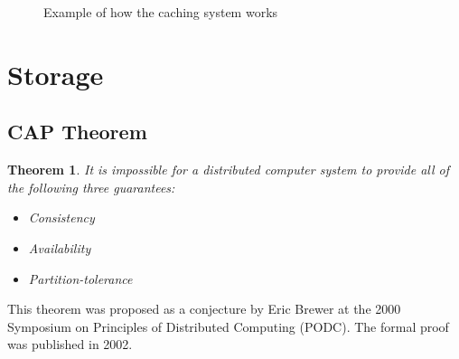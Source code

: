 \documentclass[a4paper,onecolumn,oneside,titlepage,11pt]{report}
\begin{document}
\begin{figure}[H]
\begin{center}
\end{center}
\caption{Example of how the caching system works}
\label{fig:caching}
\end{figure}

\section{Storage}
	\subsection{CAP Theorem}
	\newtheorem{capthm}{Theorem}
	\begin{capthm}
	It is impossible for a distributed computer system to provide all of the following three guarantees:
	\begin{itemize}
		\item Consistency
		\item Availability
		\item Partition-tolerance
	\end{itemize}
	\end{capthm}
	This theorem was proposed as a conjecture by Eric Brewer at the 2000 Symposium on Principles of Distributed Computing (PODC). The formal proof was published in 2002\cite{cap}.
	
\end{document}
